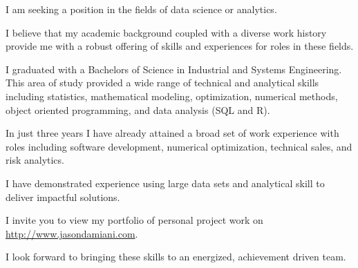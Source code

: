 \documentclass[10pt,a4paper,sans]{moderncv}        %
\begin{document}
I am seeking a position in the fields of data science or analytics.  

I believe that my academic background coupled with a diverse work history provide me with a robust offering of skills and experiences for roles in these fields.

I graduated with a Bachelors of Science in Industrial and Systems Engineering.  This area of study provided a wide range of technical and analytical skills including statistics, mathematical modeling, optimization, numerical methods, object oriented programming, and data analysis (SQL and R).

In just three years I have already attained a broad set of work experience with roles including software development, numerical optimization, technical sales, and risk analytics.

I have demonstrated experience using large data sets and analytical skill to deliver impactful solutions.

I invite you to view my portfolio of personal project work on \url{http://www.jasondamiani.com}.

I look forward to bringing these skills to an energized, achievement driven team.


\makeletterclosing

\end{document}
